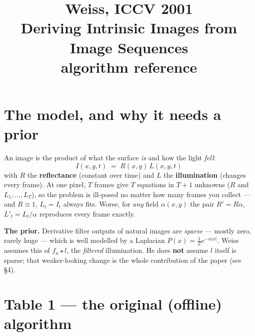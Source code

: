 \documentclass[11pt]{article}
\title{\textbf{Weiss, ICCV 2001}\\[2pt]\large Deriving Intrinsic Images from Image Sequences\\[2pt]
  \normalsize algorithm reference}
\date{}
\author{}
\begin{document}
\maketitle
\vspace{-2.4em}

\section{The model, and why it needs a prior}

An image is the product of what the surface \emph{is} and how the light \emph{fell}:
\[
  I(x,y,t) \;=\; R(x,y)\,L(x,y,t)
\]
with $R$ the \textbf{reflectance} (constant over time) and $L$ the \textbf{illumination} (changes every frame).
At one pixel, $T$ frames give $T$ equations in $T+1$ unknowns ($R$ and $L_1,\dots,L_T$), so the problem is
ill-posed no matter how many frames you collect --- and $R\equiv 1$, $L_t = I_t$ always fits. Worse, for
\emph{any} field $\alpha(x,y)$ the pair $R'=R\alpha$, $L'_t=L_t/\alpha$ reproduces every frame exactly.

\begin{notebox}\textbf{The prior.} Derivative filter outputs of natural images are \emph{sparse} --- mostly
zero, rarely huge --- which is well modelled by a Laplacian $P(x)=\frac1Z e^{-\alpha|x|}$. Weiss assumes this of
$f_n\star l$, the \emph{filtered} illumination. He does \textbf{not} assume $l$ itself is sparse; that weaker-looking
change is the whole contribution of the paper (see \S4).\end{notebox}

\section{Table 1 --- the original (offline) algorithm}
\end{document}
